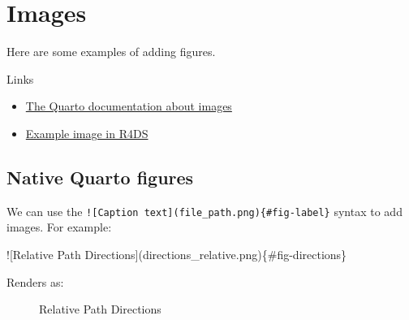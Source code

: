 \documentclass[
  letterpaper,
  DIV=11,
  numbers=noendperiod]{scrreprt}
\newenvironment{Shaded}{\begin{snugshade}}{\end{snugshade}}
\newcommand{\AlertTok}[1]{\textcolor[rgb]{0.68,0.00,0.00}{#1}}
\newcommand{\NormalTok}[1]{\textcolor[rgb]{0.00,0.23,0.31}{#1}}
\providecommand{\tightlist}{%
  \setlength{\itemsep}{0pt}\setlength{\parskip}{0pt}}\usepackage{longtable,booktabs,array}
\begin{document}
\chapter{Images}\label{sec-images}

Here are some examples of adding figures.

Links

\begin{itemize}
\tightlist
\item
  \href{https://quarto.org/docs/authoring/figures.html}{The Quarto
  documentation about images}
\item
  \href{https://github.com/hadley/r4ds/blob/main/intro.qmd}{Example
  image in R4DS}
\end{itemize}

\section{Native Quarto figures}\label{native-quarto-figures}

We can use the
\texttt{!{[}Caption\ text{]}(file\_path.png)\{\#fig-label\}} syntax to
add images. For example:

\begin{Shaded}
\begin{Highlighting}[]
\AlertTok{![Relative Path Directions](directions\_relative.png)}\NormalTok{\{\#fig{-}directions\}}
\end{Highlighting}
\end{Shaded}

Renders as:

\begin{figure}


\caption{\label{fig-directions}Relative Path Directions}

\end{figure}%
\end{document}
